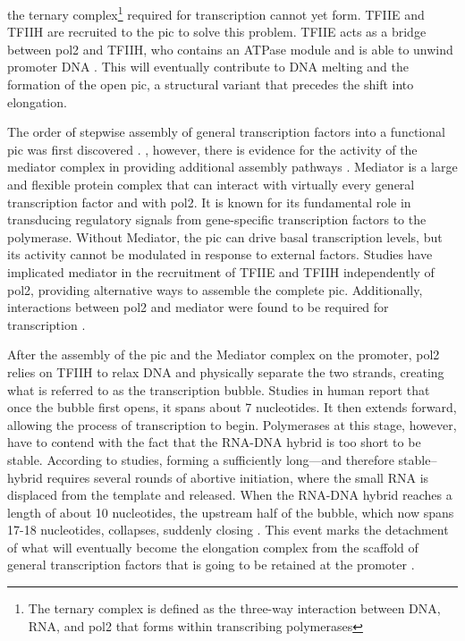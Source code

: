 the ternary complex\footnote{The ternary complex is defined as the three-way interaction between DNA, RNA, and \gls{pol2} that forms within transcribing polymerases} required for transcription cannot yet form.
TFIIE and TFIIH are recruited to the \gls{pic} to solve this problem.
TFIIE acts as a bridge between \gls{pol2} and TFIIH, who contains an ATPase module and is able to unwind promoter DNA \citep{holstege:1996:opening}.
This will eventually contribute to DNA melting and the formation of the open \gls{pic}, a structural variant that precedes the shift into elongation.



The order of stepwise assembly of general transcription factors into a functional \gls{pic} was first discovered \invitro{} \cite{buratowski:1989:five}. 
\Invivo{}, however, there is evidence for the activity of the mediator complex in providing additional assembly pathways \cite{esnault:2008:mediatordependent}.
Mediator is a large and flexible protein complex that can interact with virtually every general transcription factor and with \gls{pol2}.
It is known for its fundamental role in transducing regulatory signals from gene-specific transcription factors to the polymerase.
Without Mediator, the \gls{pic} can drive basal transcription levels, but its activity cannot be modulated in response to external factors.
Studies have implicated mediator in the recruitment of TFIIE and TFIIH independently of \gls{pol2}, providing alternative ways to assemble the complete \gls{pic}.
Additionally, interactions between \gls{pol2} and mediator were found to be required for transcription \invivo{} \cite{soutourina:2011:direct}.

After the assembly of the \gls{pic} and the Mediator complex on the promoter, \gls{pol2} relies on TFIIH to relax DNA and physically separate the two strands, creating what is referred to as the transcription bubble.
Studies in human report that once the bubble first opens, it spans about 7 nucleotides.
It then extends forward, allowing the process of transcription to begin.
Polymerases at this stage, however, have to contend with the fact that the RNA-DNA hybrid is too short to be stable.
According to \invitro{} studies, forming a sufficiently long---and therefore stable--hybrid requires several rounds of abortive initiation, where the small RNA is displaced from the template and released.
When the RNA-DNA hybrid reaches a length of about 10 nucleotides, the upstream half of the bubble, which now spans 17-18 nucleotides, collapses, suddenly closing \cite{holstege:1997:three}.
This event marks the detachment of what will eventually become the elongation complex from the scaffold of general transcription factors that is going to be retained at the promoter \cite{pal:2004:role}.

\clearpage